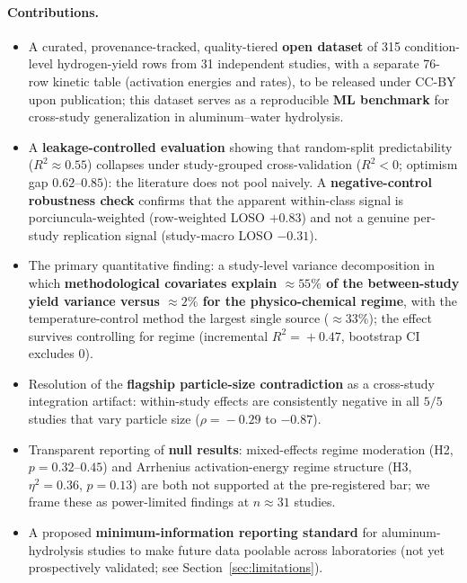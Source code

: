 \paragraph{Contributions.}
\begin{itemize}\itemsep2pt
  \item A curated, provenance-tracked, quality-tiered \textbf{open dataset} of 315
  condition-level hydrogen-yield rows from 31 independent studies, with a separate
  76-row kinetic table (activation energies and rates), to be released under CC-BY upon publication; this
  dataset serves as a reproducible \textbf{ML benchmark} for cross-study generalization
  in aluminum--water hydrolysis.
  \item A \textbf{leakage-controlled evaluation} showing that random-split predictability
  ($R^2\!\approx\!0.55$) collapses under study-grouped cross-validation ($R^2<0$; optimism
  gap $0.62$--$0.85$): the literature does not pool naively. A \textbf{negative-control
  robustness check} confirms that the apparent within-class signal is porciuncula-weighted
  (row-weighted LOSO $+0.83$) and not a genuine per-study replication signal (study-macro
  LOSO $-0.31$).
  \item The primary quantitative finding: a study-level variance decomposition in which
  \textbf{methodological covariates explain $\approx\!55\%$ of the between-study yield
  variance versus $\approx\!2\%$ for the physico-chemical regime}, with the
  temperature-control method the largest single source ($\approx\!33\%$); the effect
  survives controlling for regime (incremental $R^2\!=\!+0.47$, bootstrap CI excludes 0).
  \item Resolution of the \textbf{flagship particle-size contradiction} as a cross-study
  integration artifact: within-study effects are consistently negative in all $5/5$
  studies that vary particle size ($\rho\!=\!-0.29$ to $-0.87$).
  \item Transparent reporting of \textbf{null results}: mixed-effects regime moderation
  (H2, $p\!=\!0.32$--$0.45$) and Arrhenius activation-energy regime structure (H3,
  $\eta^2\!=\!0.36$, $p\!=\!0.13$) are both not supported at the pre-registered bar;
  we frame these as power-limited findings at $n\!\approx\!31$ studies.
  \item A proposed \textbf{minimum-information reporting standard} for aluminum-hydrolysis
  studies to make future data poolable across laboratories (not yet prospectively
  validated; see Section~\ref{sec:limitations}).
\end{itemize}
